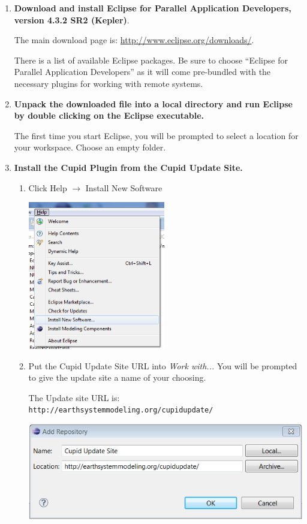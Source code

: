 \documentclass[oneside,11pt]{memoir}
\begin{document}
\begin{enumerate}

\item \textbf{Download and install Eclipse for Parallel Application Developers, version 4.3.2 SR2 (Kepler)}.

The main download page is: \href{http://www.eclipse.org/downloads/}{http://www.eclipse.org/downloads/}.  

There is a list of available Eclipse packages.  Be sure to choose ``Eclipse for Parallel Application Developers'' as it will come pre-bundled with the necessary plugins for working with remote systems.

\item \textbf{Unpack the downloaded file into a local directory and run Eclipse by double clicking on the Eclipse executable.}

The first time you start Eclipse, you will be prompted to select a location for your workspace.  Choose an empty folder.

\item \textbf{Install the Cupid Plugin from the Cupid Update Site.}

\begin{enumerate}
\itemsep2em

\item Click Help $\rightarrow$ Install New Software

\parbox{\linewidth}{\centering
  \includegraphics[width=6cm]{figs/install_fig1.png}
}

\item Put the Cupid Update Site URL into \emph{Work with...}  You will be prompted to give the update site a name of your choosing.

The Update site URL is:  \texttt{http://earthsystemmodeling.org/cupidupdate/}

\parbox{\linewidth}{\centering
  \includegraphics{figs/install_fig2.png}
}


\end{enumerate}
\end{enumerate}
\end{document}
